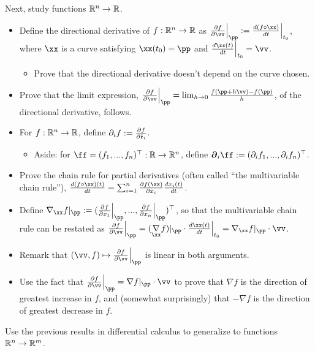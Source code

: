 Next, study functions $\mathbb{R}^n \rightarrow \mathbb{R}$.
    
\begin{itemize}
    \item Define the directional derivative of $f:\mathbb{R}^n \rightarrow \mathbb{R}$ as $\frac{\pd f}{\pd \vv} \Big|_\pp := \frac{d (f \circ \xx)}{dt}\Big|_{t_0}$, where $\xx$ is a curve satisfying $\xx(t_0) = \pp$ and $\frac{d\xx(t)}{dt}\Big|_{t_0} = \vv$.
    \begin{itemize}
        \item Prove that the directional derivative doesn't depend on the curve chosen.
    \end{itemize}
    \item Prove that the limit expression, $\frac{\pd f}{\pd \vv}\Big|_\pp = \lim_{h \rightarrow 0} \frac{f(\pp + h\vv) - f(\pp)}{h}$, of the directional derivative, follows.
    \item For $f:\mathbb{R}^n \rightarrow \mathbb{R}$, define $\partial_i f := \frac{\partial f}{\partial \hat{\mathfrak{e}}_i}$.
    \begin{itemize}
        \item Aside: for $\ff = (f_1, ..., f_n)^\top:\R \rightarrow \R^n$, define $\boldsymbol{\pd}_i \ff := (\pd_i f_1, ..., \pd_i f_n)^\top$.
    \end{itemize}
    \item Prove the chain rule for partial derivatives (often called ``the multivariable chain rule''), $\frac{d (f \circ \xx)(t)}{dt} =\sum_{i = 1}^n \frac{\pd f(\xx)}{\pd x_i} \frac{dx_i(t)}{dt}$.
    \item Define $\nabla_\xx f|_\pp := (\frac{\pd f}{\pd x_1}\Big|_\pp, ..., \frac{\pd f}{\pd x_n}\Big|_\pp)^\top$, so that the multivariable chain rule can be restated as $\frac{\pd f}{\pd \vv} \Big|_\pp = (\underset{\xx}{\nabla} f)|_\pp \cdot \frac{d\xx(t)}{dt}\Big|_{t_0}= \nabla_\xx f|_\pp \cdot \vv$.
    \item Remark that $(\vv, f) \mapsto \frac{\pd f}{\pd \vv} \Big|_\pp$ is linear in both arguments.
    \item Use the fact that $\frac{\pd f}{\pd \vv}\Big|_\pp = \nabla f|_\pp \cdot \vv$ to prove that $\nabla f$ is the direction of greatest increase in $f$, and (somewhat surprisingly) that $-\nabla f$ is the direction of greatest decrease in $f$.
\end{itemize}

Use the previous results in differential calculus to generalize to functions $\mathbb{R}^n \rightarrow \mathbb{R}^m$.

